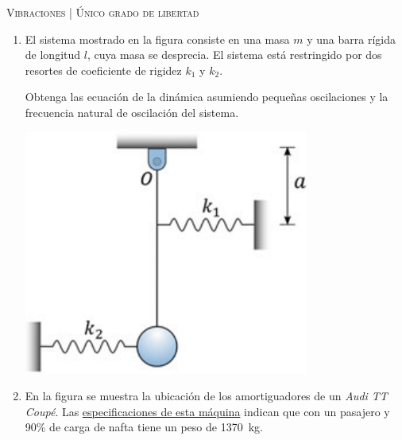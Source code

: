 \documentclass[11pt, spanish, a4paper, twopage]{article}
\begin{document}
\begin{center}
	\textsc{\large Vibraciones | Único grado de libertad}
\end{center}


\begin{enumerate}

				
\item 
\begin{minipage}[t][4cm]{0.65\textwidth}
El sistema mostrado en la figura consiste en una masa $m$ y una barra rígida de longitud $l$, cuya masa se desprecia.
El sistema está restringido por dos resortes de coeficiente de rigidez $k_1$ y $k_2$.

Obtenga las ecuación de la dinámica asumiendo pequeñas oscilaciones y la frecuencia natural de oscilación del sistema.
\end{minipage}
\begin{minipage}[c][3cm][t]{0.3\textwidth}
	\includegraphics[width=\textwidth]{figures/shabana_fig_P1_1.png}
\end{minipage}



\item 
\begin{minipage}[t][6cm]{0.65\textwidth}
En la figura se muestra la ubicación de los amortiguadores de un \emph{Audi TT Coupé}.
Las \href{https://www.audi.de/de/brand/de/neuwagen/tt/tt-coupe.html#layer=/de/brand/de/neuwagen/tt/tt-coupe.engine_compare.fvp09g_0.techdata.html}{especificaciones de esta máquina} indican que con un pasajero y 90\% de carga de nafta tiene un peso de \SI{1370}{\kilo\gram}.


\end{minipage}
\end{enumerate}
\end{document}
